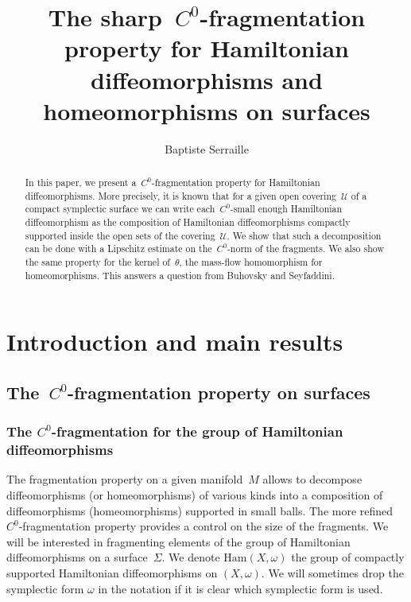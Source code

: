 \documentclass[10pt]{amsart}
\title[The sharp~$C^0$-fragmentation property]{The sharp~$C^0$-fragmentation property for Hamiltonian diffeomorphisms and homeomorphisms on surfaces}
\author{Baptiste Serraille}
\newcommand{\Ham}{\mathrm{Ham}}
\begin{document}
\begin{abstract}
In this paper, we present a~$C^0$-fragmentation property for Hamiltonian diffeomorphisms. More precisely, it is known that for a given open covering~$\mathcal{U}$ of a compact symplectic surface we can write each~$C^0$-small enough Hamiltonian diffeomorphism as the composition of Hamiltonian diffeomorphisms compactly supported inside the open sets of the covering~$\mathcal{U}$. We show that such a decomposition can be done with a Lipschitz estimate on the~$C^0$-norm of the fragments. We also show the same property for the kernel of~$\theta$, the mass-flow homomorphism for homeomorphisms. This answers a question from Buhovsky and Seyfaddini.
\end{abstract}

\maketitle

\tableofcontents

\section{Introduction and main results}\label{sec: intro}


\subsection{The~$C^0$-fragmentation property on surfaces}\label{subsec: C^0 frag for diffeo}

\subsubsection{The $C^0$-fragmentation for the group of Hamiltonian diffeomorphisms} \label{subsubsec: C^0-frag for diffeo}


The fragmentation property on a given manifold~$M$ allows to decompose diffeomorphisms (or homeomorphisms) of various kinds into a composition of diffeomorphisms (homeomorphisms) supported in small balls. The more refined~$C^0$-fragmentation property provides a control on the size of the fragments. We will be interested in fragmenting elements of the group of Hamiltonian diffeomorphisms on a surface~$\Sigma$. We denote $\Ham(X, \omega)$ the group of compactly supported Hamiltonian diffeomorphisms on $(X, \omega)$. We will sometimes drop the symplectic form $\omega$ in the notation if it is clear which symplectic form is used.
\end{document}

